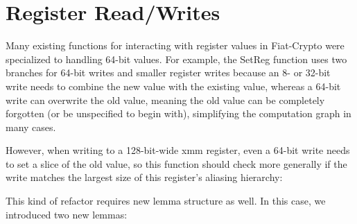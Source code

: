 

\section{Register Read/Writes}
\label{sec:reg-rw}

Many existing functions for interacting with register values in Fiat-Crypto were specialized to handling 64-bit values.
For example, the SetReg function uses two branches for 64-bit writes and smaller register writes because an 8- or 32-bit write needs to combine the new value with the existing value, whereas a 64-bit write can overwrite the old value, meaning the old value can be completely forgotten (or be unspecified to begin with), simplifying the computation graph in many cases.


However, when writing to a 128-bit-wide xmm register, even a 64-bit write needs to set a slice of the old value, so this function should check more generally if the write matches the largest size of this register's aliasing hierarchy:


This kind of refactor requires new lemma structure as well.
In this case, we introduced two new lemmas:

